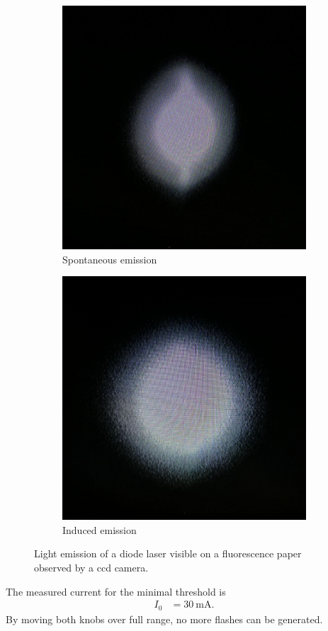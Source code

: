 \begin{figure}[ht]
		\centering
		\begin{subfigure}[b]{0.45\textwidth}
				\begin{center}
						\includegraphics[width=0.7\linewidth]{./content/pictures/below_threshold.jpg}
						\caption{Spontaneous emission}
				\label{fig:spontanious}
				\end{center}
		\end{subfigure}
		\begin{subfigure}[b]{0.45\textwidth}
				\begin{center}
						\includegraphics[width=0.7\linewidth]{./content/pictures/above_threshold.jpg}
						\caption{Induced emission}
						\label{fig:induce}
				\end{center}
		\end{subfigure}
		\caption{Light emission of a diode laser visible on a fluorescence
		paper observed by a ccd camera.}
		\label{fig:emission}
\end{figure}
The measured current for the minimal threshold is
\begin{align}
  I_0 &= \SI{30}{\milli\ampere}.
\end{align}
By moving both knobs over full range, no more flashes can be generated.


